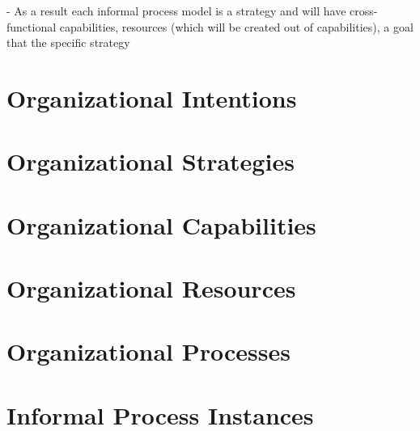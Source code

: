 - As a result each informal process model is a strategy and will have cross-functional capabilities, resources (which will be created out of capabilities), a goal that the specific strategy




\section{Organizational Intentions} 
\label{sec:intentions}


\section{Organizational Strategies} 
\label{sec:strategies}

\section{Organizational Capabilities}
\label{sec:capabilities}

\section{Organizational Resources} 
\label{sec:resources}



\section{Organizational Processes} 
\label{sec:processes}

\section{Informal Process Instances} 
\label{sec:ipinstances}
